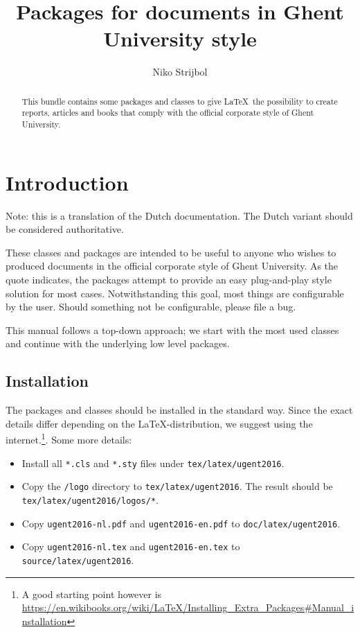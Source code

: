 \documentclass[11pt,parskip=half-]{scrartcl}
\title{Packages for documents in Ghent University style}
\author{Niko Strijbol}
\begin{document}
    \maketitle

    \begin{abstract}
        \noindent This bundle contains some packages and classes to give \LaTeX\ the possibility to create reports, articles and books that comply with the official corporate style of Ghent University.
    \end{abstract}

    \tableofcontents

    \section{Introduction}\label{sec:introductie}

    Note: this is a translation of the Dutch documentation. The Dutch variant should be considered authoritative.


    These classes and packages are intended to be useful to anyone who wishes to produced documents in the official corporate style of Ghent University. As the quote indicates, the packages attempt to provide an easy plug-and-play style solution for most cases. Notwithstanding this goal, most things are configurable by the user. Should something not be configurable, please file a bug.

    This manual follows a top-down approach; we start with the most used classes and continue with the underlying low level packages.

    \subsection{Installation}\label{subsec:installatie}
    The packages and classes should be installed in the standard way. Since the exact details differ depending on the \LaTeX-distribution, we suggest using the internet.\footnote{A good starting point however is \url{https://en.wikibooks.org/wiki/LaTeX/Installing_Extra_Packages\#Manual_installation}}. Some more details:
    \begin{itemize}
        \item Install all \texttt{*.cls} and \texttt{*.sty} files under \texttt{tex/latex/ugent2016}.
        \item Copy the \texttt{/logo} directory to \texttt{tex/latex/ugent2016}. The result should be \texttt{tex/latex/ugent2016/logos/*}.
        \item Copy \texttt{ugent2016-nl.pdf} and \texttt{ugent2016-en.pdf} to \texttt{doc/latex/ugent2016}.
        \item Copy \texttt{ugent2016-nl.tex} and \texttt{ugent2016-en.tex} to \texttt{source/latex/ugent2016}.
    \end{itemize}
\end{document}
